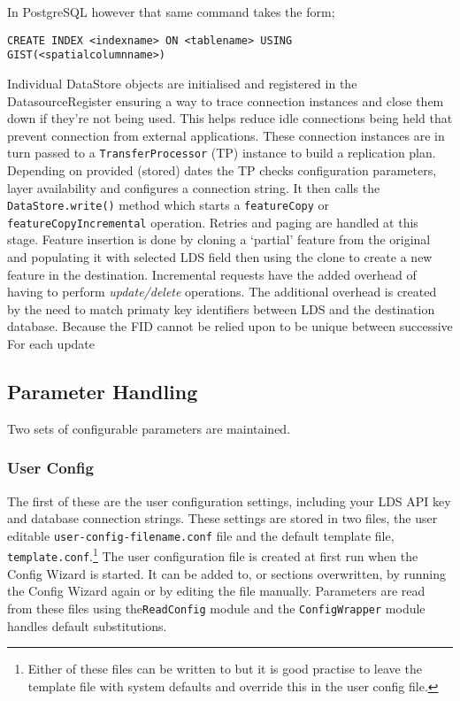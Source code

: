 \documentclass[a4paper]{report}
\begin{document}
In PostgreSQL however that same command takes the form;

 \begin{lstlisting}
CREATE INDEX <indexname> ON <tablename> USING GIST(<spatialcolumnname>)
\end{lstlisting}

Individual DataStore objects are initialised and registered in the
DatasourceRegister ensuring a way to trace connection instances and close
them down if they're not being used. This helps reduce idle connections being
held that prevent connection from external applications.
These connection instances are in turn passed to a \lstinline|TransferProcessor|
(TP) instance to build a replication plan. Depending on provided (stored) dates
the TP checks configuration parameters, layer availability and configures a connection string. It then calls the 
\lstinline|DataStore.write()| method which starts a \lstinline|featureCopy| or 
\lstinline|featureCopyIncremental| operation. Retries and paging are handled at
this stage.
Feature insertion is done by cloning a `partial' feature from the original and
populating it with selected LDS field then using the clone to create a new
feature in the destination.
Incremental requests have the added overhead of having to perform
\emph{update/delete} operations. The additional overhead is created by the need
to match primaty key identifiers between LDS and the destination database.
Because the FID cannot be relied upon to be unique between successive For each
update

\subsection*{Parameter Handling}
Two sets of configurable parameters are maintained. 

\subsubsection*{User Config}
The first of these are
the user configuration settings, including your LDS API key and database
connection strings. These settings are stored in two files, the user editable
\lstinline|user-config-filename.conf| file and the default template file,
\lstinline|template.conf|.\footnote{Either of these files can be written to but
it is good practise to leave the template file with system defaults
and override this in the user config file.} The user configuration file is
created at first run when the Config Wizard is started. It can be added to, or
sections overwritten, by running the Config Wizard again or by editing the file
manually. Parameters are read from these files using
the\lstinline|ReadConfig| module and the  \lstinline|ConfigWrapper| module
handles default substitutions.
\end{document}
